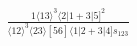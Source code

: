 \documentclass[varwidth, border=5pt]{standalone}
\begin{document}
\begin{my}
$\begin{gathered}
\scriptscriptstyle\frac{1⟨13⟩^3⟨2|1+3|5]^2}{⟨12⟩^3⟨23⟩[56]⟨1|2+3|4]s_{123}}
\end{gathered}$
\end{my}
\end{document}

